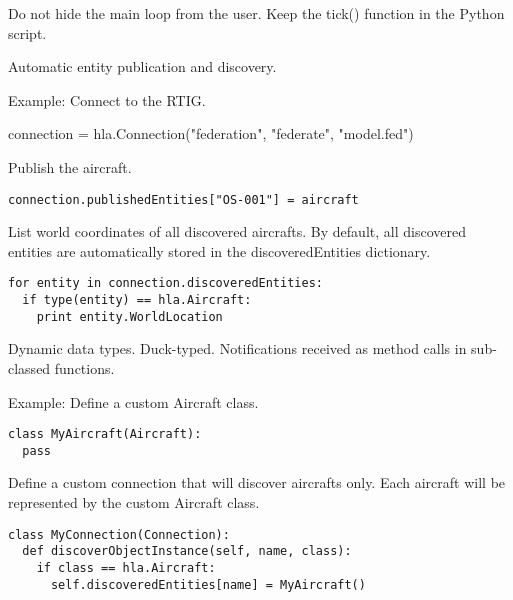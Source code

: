 \documentclass[12pt,a4paper]{howto}
\begin{document}
Do not hide the main loop from the user. Keep the tick() function in the Python script.

Automatic entity publication and discovery.

Example:
Connect to the RTIG.

connection = hla.Connection("federation", "federate", "model.fed")

Publish the aircraft.

\begin{verbatim}
connection.publishedEntities["OS-001"] = aircraft
\end{verbatim}

List world coordinates of all discovered aircrafts. By default, all discovered
entities are automatically stored in the discoveredEntities dictionary.

\begin{verbatim}
for entity in connection.discoveredEntities:
  if type(entity) == hla.Aircraft:
    print entity.WorldLocation
\end{verbatim}

Dynamic data types. Duck-typed.
Notifications received as method calls in sub-classed functions.

Example:
Define a custom Aircraft class.

\begin{verbatim}
class MyAircraft(Aircraft):
  pass
\end{verbatim}

Define a custom connection that will discover aircrafts only. Each aircraft will
be represented by the custom Aircraft class.

\begin{verbatim}
class MyConnection(Connection):
  def discoverObjectInstance(self, name, class):
    if class == hla.Aircraft:
      self.discoveredEntities[name] = MyAircraft()
\end{verbatim}


\end{document}
